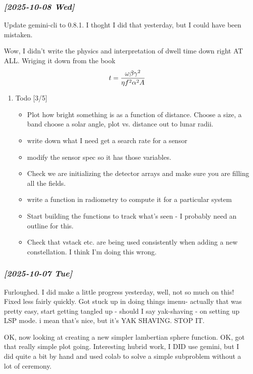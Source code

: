 \documentclass[11pt]{article}
\begin{document}
\subsubsection{\textit{[2025-10-08 Wed]}}
\label{sec:org60dfbe4}
Update gemini-cli  to 0.8.1.  I thoght I did that yesterday, but I could have
been mistaken.

Wow, I didn't write the physics and interpretation of dwell time down right AT ALL.
Wriging it down from the book 
$$t = {\omega\beta\gamma^2 \over   \eta f^2 \alpha^2  A  }  $$

\begin{enumerate}
\item Todo  [3/5]
\label{sec:org86b7260}
\begin{itemize}
\item[{$\boxtimes$}] Plot how bright something is as a function of distance. Choose a size, a band
choose a solar angle, plot vs. distance out to lunar radii.
\item[{$\boxtimes$}] write down what I need get a search rate for a sensor
\item[{$\boxtimes$}] modify the sensor spec so it has those variables.
\item[{$\square$}] Check we are initializing the detector arrays and make sure you are filling
all the fields.
\item[{$\square$}] write a function in radiometry to compute it for a particular system
\item[{$\square$}] Start building the functions to track what's seen - I probably need
an outline for this.
\item[{$\square$}] Check that vstack etc. are being used consistently when adding a new constellation.
I think I'm doing this wrong.
\end{itemize}
\end{enumerate}

\subsubsection{\textit{[2025-10-07 Tue]}}
\label{sec:org233accf}
Furloughed.  I did make a little progress yesterday, well, not so much on this!
Fixed less fairly quickly.
Got stuck up in doing things imenu- actually that was pretty easy, start getting
tangled up - should I say yak-shaving - on setting up LSP mode.  i mean that's nice,
but it's YAK SHAVING. STOP IT.

OK, now looking at creating a new simpler lambertian sphere function.
OK, got that really simple plot going. Interesting hubrid work, I DID use
gemini, but I did quite a bit by hand and used colab to solve a simple subproblem
without a lot of ceremony.  
\end{document}

